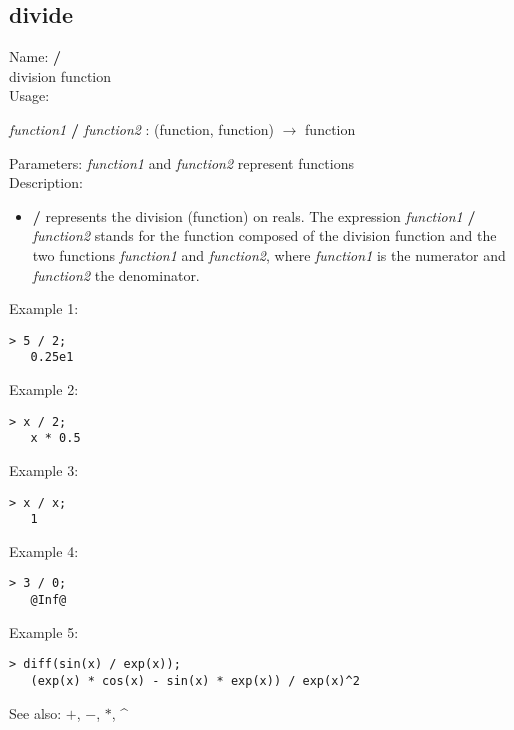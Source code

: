 \subsection{ divide }
\noindent Name: \textbf{/}\\
division function\\

\noindent Usage: 
\begin{center}
\emph{function1} \textbf{/} \emph{function2} : (\textsf{function}, \textsf{function}) $\rightarrow$ \textsf{function}\\
\end{center}
Parameters: 
\emph{function1} and \emph{function2} represent functions\\

\noindent Description: \begin{itemize}

\item \textbf{/} represents the division (function) on reals. 
   The expression \emph{function1} \textbf{/} \emph{function2} stands for
   the function composed of the division function and the two
   functions \emph{function1} and \emph{function2}, where \emph{function1} is
   the numerator and \emph{function2} the denominator.
\end{itemize}
\noindent Example 1: 
\begin{center}\begin{minipage}{14.8cm}\begin{Verbatim}[frame=single]
   > 5 / 2;
   0.25e1
\end{Verbatim}
\end{minipage}\end{center}
\noindent Example 2: 
\begin{center}\begin{minipage}{14.8cm}\begin{Verbatim}[frame=single]
   > x / 2;
   x * 0.5
\end{Verbatim}
\end{minipage}\end{center}
\noindent Example 3: 
\begin{center}\begin{minipage}{14.8cm}\begin{Verbatim}[frame=single]
   > x / x;
   1
\end{Verbatim}
\end{minipage}\end{center}
\noindent Example 4: 
\begin{center}\begin{minipage}{14.8cm}\begin{Verbatim}[frame=single]
   > 3 / 0;
   @Inf@
\end{Verbatim}
\end{minipage}\end{center}
\noindent Example 5: 
\begin{center}\begin{minipage}{14.8cm}\begin{Verbatim}[frame=single]
   > diff(sin(x) / exp(x));
   (exp(x) * cos(x) - sin(x) * exp(x)) / exp(x)^2
\end{Verbatim}
\end{minipage}\end{center}
See also: \textbf{$+$}, \textbf{$-$}, \textbf{$*$}, \textbf{\^}
